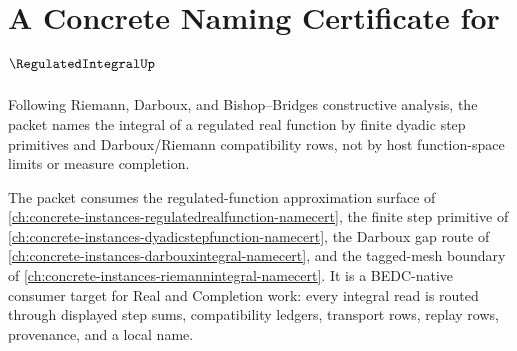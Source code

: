 \chapter{A Concrete Naming Certificate for $\RegulatedIntegralUp$}
\label{ch:concrete-instances-regulatedintegral-namecert}

Following Riemann, Darboux, and Bishop--Bridges constructive analysis, the packet names the integral of a regulated real function by finite dyadic step primitives and Darboux/Riemann compatibility rows, not by host function-space limits or measure completion.

The packet consumes the regulated-function approximation surface of \autoref{ch:concrete-instances-regulatedrealfunction-namecert}, the finite step primitive of \autoref{ch:concrete-instances-dyadicstepfunction-namecert}, the Darboux gap route of \autoref{ch:concrete-instances-darbouxintegral-namecert}, and the tagged-mesh boundary of \autoref{ch:concrete-instances-riemannintegral-namecert}. It is a BEDC-native consumer target for Real and Completion work: every integral read is routed through displayed step sums, compatibility ledgers, transport rows, replay rows, provenance, and a local name.

